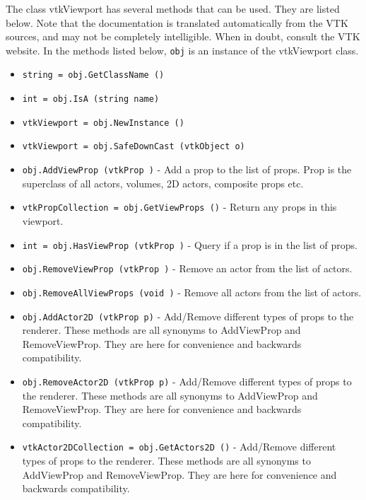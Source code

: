 The class vtkViewport has several methods that can be used.
  They are listed below.
Note that the documentation is translated automatically from the VTK sources,
and may not be completely intelligible.  When in doubt, consult the VTK website.
In the methods listed below, \verb|obj| is an instance of the vtkViewport class.
\begin{itemize}
\item  \verb|string = obj.GetClassName ()|

\item  \verb|int = obj.IsA (string name)|

\item  \verb|vtkViewport = obj.NewInstance ()|

\item  \verb|vtkViewport = obj.SafeDownCast (vtkObject o)|

\item  \verb|obj.AddViewProp (vtkProp )| -  Add a prop to the list of props. Prop is the superclass of all
 actors, volumes, 2D actors, composite props etc.

\item  \verb|vtkPropCollection = obj.GetViewProps ()| -  Return any props in this viewport.

\item  \verb|int = obj.HasViewProp (vtkProp )| -  Query if a prop is in the list of props.

\item  \verb|obj.RemoveViewProp (vtkProp )| -  Remove an actor from the list of actors.

\item  \verb|obj.RemoveAllViewProps (void )| -  Remove all actors from the list of actors.

\item  \verb|obj.AddActor2D (vtkProp p)| -  Add/Remove different types of props to the renderer.
 These methods are all synonyms to AddViewProp and RemoveViewProp.
 They are here for convenience and backwards compatibility.

\item  \verb|obj.RemoveActor2D (vtkProp p)| -  Add/Remove different types of props to the renderer.
 These methods are all synonyms to AddViewProp and RemoveViewProp.
 They are here for convenience and backwards compatibility.

\item  \verb|vtkActor2DCollection = obj.GetActors2D ()| -  Add/Remove different types of props to the renderer.
 These methods are all synonyms to AddViewProp and RemoveViewProp.
 They are here for convenience and backwards compatibility.


\end{itemize}
